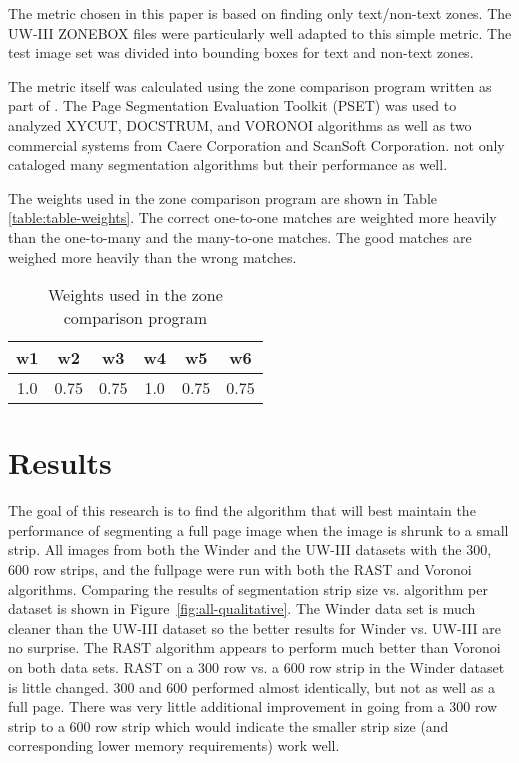 \documentclass[conference]{IEEEtran}
\begin{document}
The metric chosen in this paper is based on finding only text/non-text zones.
The UW-III ZONEBOX files were particularly well adapted to this simple
metric. The \cite{winder2010extending} test image set was divided into bounding boxes for text
and non-text zones. 

The metric itself was calculated using the zone comparison program written as
part of \cite{winder2010extending}. 
The Page Segmentation Evaluation Toolkit (PSET) \cite{mao2000pset} was used to analyzed XYCUT,
DOCSTRUM, and VORONOI algorithms as well as two commercial systems from
Caere Corporation and ScanSoft Corporation. \cite{mao2003document} not only
cataloged many segmentation algorithms but their performance as well.


The weights used in the zone comparison program are shown in Table
\ref{table:table-weights}. The
correct one-to-one matches are weighted more heavily than the one-to-many and
the many-to-one matches. The good matches are weighed more heavily than the
wrong matches.

\begin{table}
\begin{center}
\caption{Weights used in the zone comparison program}
\label{table:table-weights}
\label{table-weights}
\begin{tabular}{|c|c|c|c|c|c|}
\hline
  w1 & w2 & w3 & w4 & w5 & w6 \\
 \hline
  1.0  & 0.75 & 0.75 & 1.0 & 0.75 & 0.75 \\
\hline
\end{tabular}
\end{center}
\end{table}

\section{Results}

The goal of this research is to find the algorithm that will best
maintain the performance of segmenting a full page image when the image is shrunk to a small strip. 
All images from both the Winder and the UW-III datasets with 
the 300, 600 row strips, and the fullpage were run with both the RAST and
Voronoi algorithms. 
Comparing the results of segmentation strip size vs. algorithm per dataset
is shown in Figure~\ref{fig:all-qualitative}. 
The Winder data set is much cleaner than the UW-III dataset 
so the better results for Winder vs. UW-III are no surprise. 
The RAST algorithm appears to perform much better than Voronoi on both data sets.
RAST on a 300 row vs. a 600 row strip in the Winder dataset is little changed.
300 and 600 performed almost identically, but not as well as a full page. There
was very little additional improvement in going from a 300 row strip to a 600
row strip which would indicate the smaller strip size (and corresponding lower
memory requirements) work well.
\end{document}
